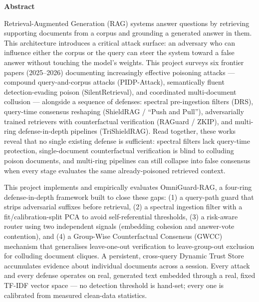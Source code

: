 \begin{center}
{\Large\bfseries\color{navy} Abstract}
\end{center}
\vspace{0.4em}

Retrieval-Augmented Generation (RAG) systems answer questions by retrieving
supporting documents from a corpus and grounding a generated answer in
them. This architecture introduces a critical attack surface: an adversary
who can influence either the corpus or the query can steer the system
toward a false answer without touching the model's weights. This project
surveys six frontier papers (2025--2026) documenting increasingly
effective poisoning attacks --- compound query-and-corpus attacks
(PIDP-Attack), semantically fluent detection-evading poison
(SilentRetrieval), and coordinated multi-document collusion --- alongside
a sequence of defenses: spectral pre-ingestion filters (DRS), query-time
consensus reshaping (ShieldRAG / ``Push and Pull''), adversarially trained
retrievers with counterfactual verification (RAGuard / ZKIP), and
multi-ring defense-in-depth pipelines (TriShieldRAG). Read together, these
works reveal that no single existing defense is sufficient: spectral
filters lack query-time protection, single-document counterfactual
verification is blind to colluding poison documents, and multi-ring
pipelines can still collapse into false consensus when every stage
evaluates the same already-poisoned retrieved context.

\vspace{0.6em}
This project implements and empirically evaluates OmniGuard-RAG, a
four-ring defense-in-depth framework built to close these gaps: (1) a
query-path guard that strips adversarial suffixes before retrieval, (2) a
spectral ingestion filter with a fit/calibration-split PCA to avoid
self-referential thresholds, (3) a risk-aware router using two independent
signals (embedding cohesion and answer-vote contention), and (4) a
Group-Wise Counterfactual Consensus (GWCC) mechanism that generalises
leave-one-out verification to leave-group-out exclusion for colluding
document cliques. A persistent, cross-query Dynamic Trust Store
accumulates evidence about individual documents across a session. Every
attack and every defense operates on real, generated text embedded through
a real, fixed TF-IDF vector space --- no detection threshold is hand-set;
every one is calibrated from measured clean-data statistics.

